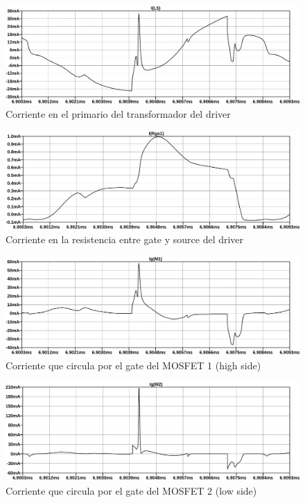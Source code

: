 \begin{figure}[ht]
    \centering
    \includegraphics[width=\textwidth]{images/sim/6.pdf}
    \caption{Corriente en el primario del transformador del driver}
    \label{fig:sim:6}
\end{figure}

\begin{figure}[ht]
    \centering
    \includegraphics[width=\textwidth]{images/sim/7.pdf}
    \caption{Corriente en la resistencia entre gate y source del driver}
    \label{fig:sim:7}
\end{figure}

\begin{figure}[ht]
    \centering
    \includegraphics[width=\textwidth]{images/sim/8.pdf}
    \caption{Corriente que circula por el gate del MOSFET 1 (high side)}
    \label{fig:sim:8}
\end{figure}

\begin{figure}[ht]
    \centering
    \includegraphics[width=\textwidth]{images/sim/9.pdf}
    \caption{Corriente que circula por el gate del MOSFET 2 (low side)}
    \label{fig:sim:9}
\end{figure}

